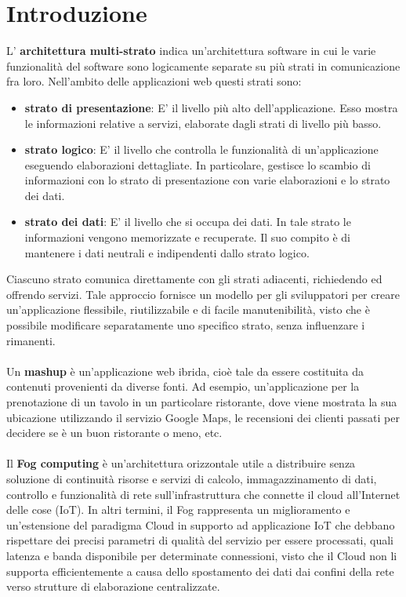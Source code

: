 \chapter{Introduzione}
L' \textbf{architettura multi-strato} indica un'architettura software in cui le varie funzionalità del software sono logicamente separate su più strati in comunicazione fra loro. Nell'ambito delle applicazioni web questi strati sono:
\begin{itemize}
\item \textbf{strato di presentazione}: E' il livello più alto dell'applicazione. Esso mostra le informazioni relative a servizi, elaborate dagli strati di livello più basso.
\item \textbf{strato logico}: E' il livello che controlla le funzionalità di un'applicazione eseguendo elaborazioni dettagliate. In particolare, gestisce lo scambio di informazioni con lo strato di presentazione con varie elaborazioni e lo strato dei dati.
\item \textbf{strato dei dati}: E' il livello che si occupa dei dati. In tale strato le informazioni vengono memorizzate e recuperate. Il suo compito è di mantenere i dati neutrali e indipendenti dallo strato logico.
\end{itemize}
Ciascuno strato comunica direttamente con gli strati adiacenti, richiedendo ed offrendo servizi. Tale approccio fornisce un modello per gli sviluppatori per creare un'applicazione flessibile, riutilizzabile e di facile manutenibilità, visto che è possibile modificare separatamente uno specifico strato, senza influenzare i rimanenti.\\\\Un \textbf{mashup} è un'applicazione web ibrida, cioè tale da essere costituita da contenuti provenienti da diverse fonti. Ad esempio, un'applicazione per la prenotazione di un tavolo in un particolare ristorante, dove viene mostrata la sua ubicazione utilizzando il servizio Google Maps, le recensioni dei clienti passati per decidere se è un buon ristorante o meno, etc.\\\\Il \textbf{Fog computing} è un'architettura orizzontale utile a distribuire senza soluzione di continuità risorse e servizi di calcolo, immagazzinamento di dati, controllo e funzionalità di rete sull'infrastruttura che connette il cloud all'Internet delle cose (IoT). In altri termini, il Fog rappresenta un miglioramento e un'estensione del paradigma Cloud in supporto ad applicazione IoT che debbano rispettare dei precisi parametri di qualità del servizio per essere processati, quali latenza e banda disponibile per determinate connessioni, visto che il Cloud non li supporta efficientemente a causa dello spostamento dei dati dai confini della rete verso strutture di elaborazione centralizzate. 
